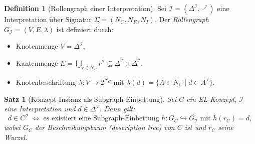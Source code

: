 ﻿\documentclass[a4paper,12pt]{article}
\theoremstyle{definition}
\newtheorem{definition}{Definition}[section]
\theoremstyle{plain}
\newtheorem{satz}{Satz}[section]
\theoremstyle{remark}
\newcommand{\interp}[1]{\ensuremath{\mathcal{#1}}}
\newcommand{\Dom}[1]{\ensuremath{\Delta^{\interp{#1}}}}
\begin{document}
\begin{definition}[Rollengraph einer Interpretation]
\label{def:rollengraph}
Sei $\interp{I} = (\Dom{I}, \cdot^\interp{I})$ eine Interpretation
{\"u}ber Signatur $\Sigma = (N_C, N_R, N_I)$.
Der \emph{Rollengraph} $G_\interp{I} = (V, E, \lambda)$ ist definiert durch:
\begin{itemize}
  \item Knotenmenge $V = \Dom{I}$,
  \item Kantenmenge $E = \bigcup_{r \in N_R} r^\interp{I}
        \subseteq \Dom{I} \times \Dom{I}$,
  \item Knotenbeschriftung $\lambda: V \to 2^{N_C}$
        mit $\lambda(d) = \{A \in N_C \mid d \in A^\interp{I}\}$.
\end{itemize}
\end{definition}

\begin{satz}[Konzept-Instanz als Subgraph-Einbettung]
\label{satz:instanz-subgraph}
Sei $C$ ein \textsf{EL}-Konzept,
$\interp{I}$ eine Interpretation und $d \in \Dom{I}$.
Dann gilt:
\[
  d \in C^\interp{I}
  \;\iff\;
  \text{es existiert eine Subgraph-Einbettung }
  h: G_C \hookrightarrow G_\interp{I}
  \text{ mit } h(r_C) = d,
\]
wobei $G_C$ der \emph{Beschreibungsbaum} (description tree)
von $C$ ist und $r_C$ seine Wurzel.
\end{satz}
\end{document}
